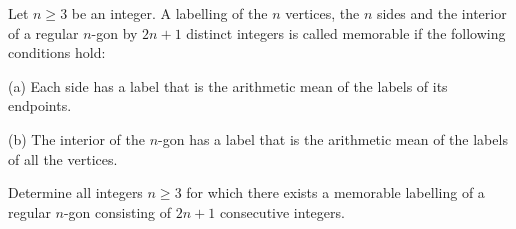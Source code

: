Let $n \geq 3$ be an integer. A labelling of the $n$ vertices, the $n$ sides and the interior of a regular $n$-gon by $2n + 1$ distinct integers is called memorable if the following conditions hold:

(a) Each side has a label that is the arithmetic mean of the labels of its endpoints.

(b) The interior of the $n$-gon has a label that is the arithmetic mean of the labels of all the vertices.

Determine all integers $n \geq 3$ for which there exists a memorable labelling of a regular $n$-gon consisting of $2n + 1$ consecutive integers.